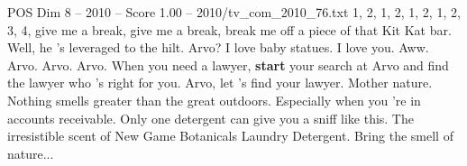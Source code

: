 \begin{textsample}{POS Dim 8 – 2010 – Score 1.00 – 2010/tv\_com\_2010\_76.txt}  \label{ex:f8_pos_060}
1, 2, 1, 2, 1, 2, 1, 2, 3, 4, give me a break, give me a break, break me off a piece of that Kit Kat bar.
Well, he 's leveraged to the hilt.
Arvo?
I love baby statues.
I love you.
Aww.
Arvo.
Arvo.
Arvo.
When you need a lawyer, \textbf{start} your search at Arvo and find the lawyer who 's right for you.
Arvo, let 's find your lawyer.
Mother nature.
Nothing smells greater than the great outdoors.
Especially when you 're in accounts receivable.
Only one detergent can give you a sniff like this.
The irresistible scent of New Game Botanicals Laundry Detergent.
Bring the smell of nature...

\end{textsample}

